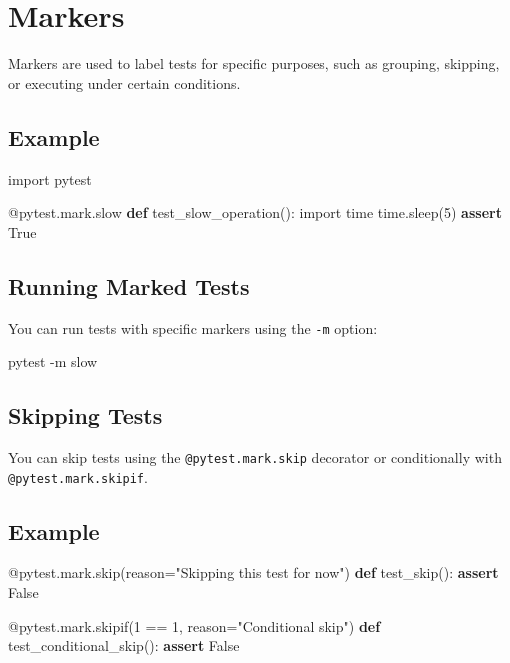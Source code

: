 \documentclass[
  letterpaper,
  DIV=11,
  numbers=noendperiod]{scrreprt}
\newenvironment{Shaded}{\begin{snugshade}}{\end{snugshade}}
\newcommand{\AttributeTok}[1]{\textcolor[rgb]{0.40,0.45,0.13}{#1}}
\newcommand{\ControlFlowTok}[1]{\textcolor[rgb]{0.00,0.23,0.31}{\textbf{#1}}}
\newcommand{\DecValTok}[1]{\textcolor[rgb]{0.68,0.00,0.00}{#1}}
\newcommand{\ExtensionTok}[1]{\textcolor[rgb]{0.00,0.23,0.31}{#1}}
\newcommand{\ImportTok}[1]{\textcolor[rgb]{0.00,0.46,0.62}{#1}}
\newcommand{\KeywordTok}[1]{\textcolor[rgb]{0.00,0.23,0.31}{\textbf{#1}}}
\newcommand{\NormalTok}[1]{\textcolor[rgb]{0.00,0.23,0.31}{#1}}
\newcommand{\OperatorTok}[1]{\textcolor[rgb]{0.37,0.37,0.37}{#1}}
\newcommand{\StringTok}[1]{\textcolor[rgb]{0.13,0.47,0.30}{#1}}
\newcommand{\VariableTok}[1]{\textcolor[rgb]{0.07,0.07,0.07}{#1}}
\begin{document}
\section{Markers}\label{markers}

Markers are used to label tests for specific purposes, such as grouping,
skipping, or executing under certain conditions.

\subsection{Example}\label{example-22}

\begin{Shaded}
\begin{Highlighting}[]
\ImportTok{import}\NormalTok{ pytest}

\AttributeTok{@pytest.mark.slow}
\KeywordTok{def}\NormalTok{ test\_slow\_operation():}
    \ImportTok{import}\NormalTok{ time}
\NormalTok{    time.sleep(}\DecValTok{5}\NormalTok{)}
    \ControlFlowTok{assert} \VariableTok{True}
\end{Highlighting}
\end{Shaded}

\subsection{Running Marked Tests}\label{running-marked-tests}

You can run tests with specific markers using the \texttt{-m} option:

\begin{Shaded}
\begin{Highlighting}[]
\ExtensionTok{pytest} \AttributeTok{{-}m}\NormalTok{ slow}
\end{Highlighting}
\end{Shaded}

\subsection{Skipping Tests}\label{skipping-tests-1}

You can skip tests using the \texttt{@pytest.mark.skip} decorator or
conditionally with \texttt{@pytest.mark.skipif}.

\subsection{Example}\label{example-23}

\begin{Shaded}
\begin{Highlighting}[]
\AttributeTok{@pytest.mark.skip}\NormalTok{(reason}\OperatorTok{=}\StringTok{"Skipping this test for now"}\NormalTok{)}
\KeywordTok{def}\NormalTok{ test\_skip():}
    \ControlFlowTok{assert} \VariableTok{False}

\AttributeTok{@pytest.mark.skipif}\NormalTok{(}\DecValTok{1} \OperatorTok{==} \DecValTok{1}\NormalTok{, reason}\OperatorTok{=}\StringTok{"Conditional skip"}\NormalTok{)}
\KeywordTok{def}\NormalTok{ test\_conditional\_skip():}
    \ControlFlowTok{assert} \VariableTok{False}
\end{Highlighting}
\end{Shaded}
\end{document}
